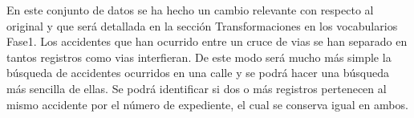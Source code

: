En este conjunto de datos se ha hecho un cambio relevante con respecto al original y que será detallada en la sección Transformaciones en los vocabularios Fase1. Los accidentes que han ocurrido entre un cruce de vias se han separado en tantos registros como vias interfieran. De este modo será mucho más simple la búsqueda de accidentes ocurridos en una calle y se podrá hacer una búsqueda más sencilla de ellas. Se podrá identificar si dos o más registros pertenecen al mismo accidente por el número de expediente, el cual se conserva igual en ambos.



